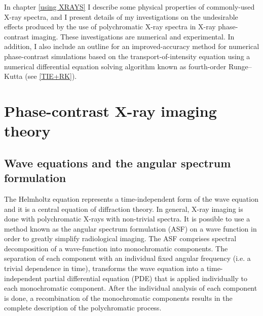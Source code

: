 \documentclass[10pt, a4paper, singlespacing]{report}
\begin{document}
In chapter \ref{using XRAYS} I describe some physical properties of commonly-used X-ray spectra, and I present details of my investigations on the undesirable effects produced by the use of polychromatic X-ray spectra in X-ray phase-contrast imaging. These investigations are numerical and experimental. In addition, I also include an outline for an improved-accuracy method for numerical phase-contrast simulations based on the transport-of-intensity equation using a numerical differential equation solving algorithm known as fourth-order Runge–Kutta (see \ref{TIE+RK}). 


\chapter{Phase-contrast X-ray imaging theory}\label{PC}

\section{Wave equations and the angular spectrum formulation}\label{ASF}
The Helmholtz equation represents a time-independent form of the wave equation and it is a central equation of diffraction theory\cite{CH49}\cite{Pags2006}.
In general, X-ray imaging is done with polychromatic X-rays with non-trivial spectra\cite{CH49}. It is possible to use a method known as the angular spectrum formulation (ASF) on a wave function in order to greatly simplify radiological imaging. The ASF comprises spectral decomposition of a wave-function into monochromatic components. The separation of each component with an individual fixed angular frequency (i.e. a trivial dependence in time), transforms the wave equation into a time-independent partial differential equation (PDE) that is applied individually to each monochromatic component. After the individual analysis of each component is done, a recombination of the monochromatic components results in the complete description of the polychromatic process\cite{CH49}\cite{Pags2006}.
\end{document}
